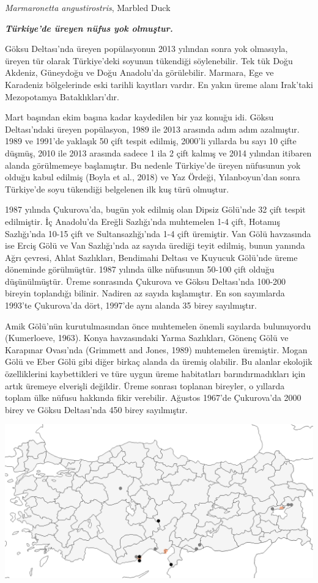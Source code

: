 \documentclass[
  a4paper,
  DIV=11,
  numbers=noendperiod]{scrartcl}
\begin{document}
\emph{Marmaronetta angustirostris}, Marbled Duck

\textbf{\emph{Türkiye'de üreyen nüfus yok olmuştur.}}

Göksu Deltası'nda üreyen popülasyonun 2013 yılından sonra yok olmasıyla,
üreyen tür olarak Türkiye'deki soyunun tükendiği söylenebilir. Tek tük
Doğu Akdeniz, Güneydoğu ve Doğu Anadolu'da görülebilir. Marmara, Ege ve
Karadeniz bölgelerinde eski tarihli kayıtları vardır. En yakın üreme
alanı Irak'taki Mezopotamya Bataklıkları'dır.

Mart başından ekim başına kadar kaydedilen bir yaz konuğu idi. Göksu
Deltası'ndaki üreyen popülasyon, 1989 ile 2013 arasında adım adım
azalmıştır. 1989 ve 1991'de yaklaşık 50 çift tespit edilmiş, 2000'li
yıllarda bu sayı 10 çifte düşmüş, 2010 ile 2013 arasında sadece 1 ila 2
çift kalmış ve 2014 yılından itibaren alanda görülmemeye başlamıştır. Bu
nedenle Türkiye'de üreyen nüfusunun yok olduğu kabul edilmiş (Boyla et
al., 2018) ve Yaz Ördeği, Yılanboyun'dan sonra Türkiye'de soyu tükendiği
belgelenen ilk kuş türü olmuştur.

1987 yılında Çukurova'da, bugün yok edilmiş olan Dipsiz Gölü'nde 32 çift
tespit edilmiştir. İç Anadolu'da Ereğli Sazlığı'nda muhtemelen 1-4 çift,
Hotamış Sazlığı'nda 10-15 çift ve Sultansazlığı'nda 1-4 çift üremiştir.
Van Gölü havzasında ise Erciş Gölü ve Van Sazlığı'nda az sayıda ürediği
teyit edilmiş, bunun yanında Ağrı çevresi, Ahlat Sazlıkları, Bendimahi
Deltası ve Kuyucuk Gölü'nde üreme döneminde görülmüştür. 1987 yılında
ülke nüfusunun 50-100 çift olduğu düşünülmüştür. Üreme sonrasında
Çukurova ve Göksu Deltası'nda 100-200 bireyin toplandığı bilinir.
Nadiren az sayıda kışlamıştır. En son sayımlarda 1993'te Çukurova'da
dört, 1997'de aynı alanda 35 birey sayılmıştır.

Amik Gölü'nün kurutulmasından önce muhtemelen önemli sayılarda
bulunuyordu (Kumerloeve, 1963). Konya havzasındaki Yarma Sazlıkları,
Gönenç Gölü ve Karapınar Ovası'nda (Grimmett and Jones, 1989) muhtemelen
üremiştir. Mogan Gölü ve Eber Gölü gibi diğer birkaç alanda da üremiş
olabilir. Bu alanlar ekolojik özelliklerini kaybettikleri ve türe uygun
üreme habitatları barındırmadıkları için artık üremeye elverişli
değildir. Üreme sonrası toplanan bireyler, o yıllarda toplam ülke nüfusu
hakkında fikir verebilir. Ağustos 1967'de Çukurova'da 2000 birey ve
Göksu Deltası'nda 450 birey sayılmıştır.

\includegraphics{images/harita_Marmaronetta angustirostris.png}
\end{document}
